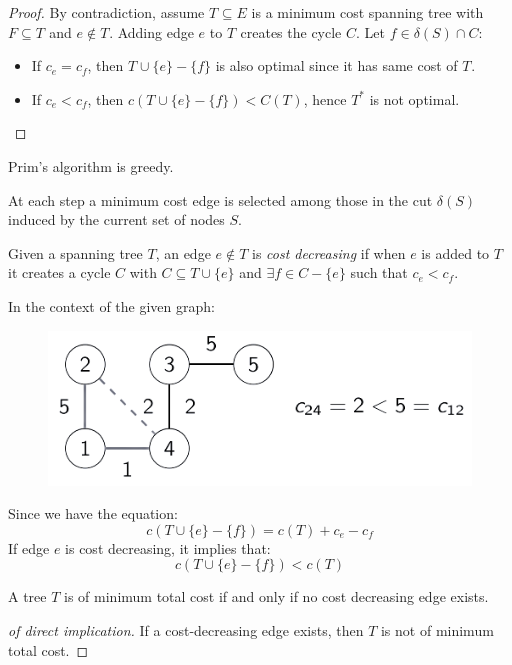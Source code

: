 \documentclass[12pt, a4paper]{report}
\begin{document}
    \begin{proof}
        By contradiction, assume $T^{} \subseteq E$ is a minimum cost spanning tree with $F \subseteq T^{}$ and $e \notin T^{}$. 
        Adding edge $e$ to $T^{}$ creates the cycle $C$. 
        Let $f \in \delta(S) \cap C$: 
        \begin{itemize}
            \item If $c_e=c_f$, then $T^{}\cup\{e\}-\{f\}$ is also optimal since it has same cost of $T^{}$.
            \item If $c_e<c_f$, then $c\left(T^{}\cup\{e\}-\{f\}\right)<C(T^{})$, hence $T^{*}$ is not optimal.
        \end{itemize}
    \end{proof}
    \begin{proposition}
        Prim's algorithm is greedy. 
    \end{proposition}     
    At each step a minimum cost edge is selected among those in the cut $\delta (S)$ induced by the current set of nodes $S$. 
    \begin{definition}
        Given a spanning tree $T$, an edge $e \notin T$ is \emph{cost decreasing} if when $e$ is added to $T$ it creates a cycle $C$ with $C \subseteq T \cup \{e\}$ and $\exists f \in C-\{e\}$ such that $c_e<c_f$. 
    \end{definition}
    \begin{example}
        In the context of the given graph:
        \begin{figure}[H]
            \centering
            \includegraphics[width=0.5\linewidth]{images/costdecreasing.png}
        \end{figure}
        Since we have the equation:
        \[c(T \cup \{e\}-\{f\})=c(T)+c_e-c_f\]
        If edge $e$ is cost decreasing, it implies that:
        \[c(T \cup \{e\}-\{f\})<c(T)\]
    \end{example}
    \begin{theorem}
        A tree $T$ is of minimum total cost if and only if no cost decreasing edge exists. 
    \end{theorem}
    \begin{proof}[of direct implication]
        If a cost-decreasing edge exists, then $T$ is not of minimum total cost.
    \end{proof}
\end{document}
